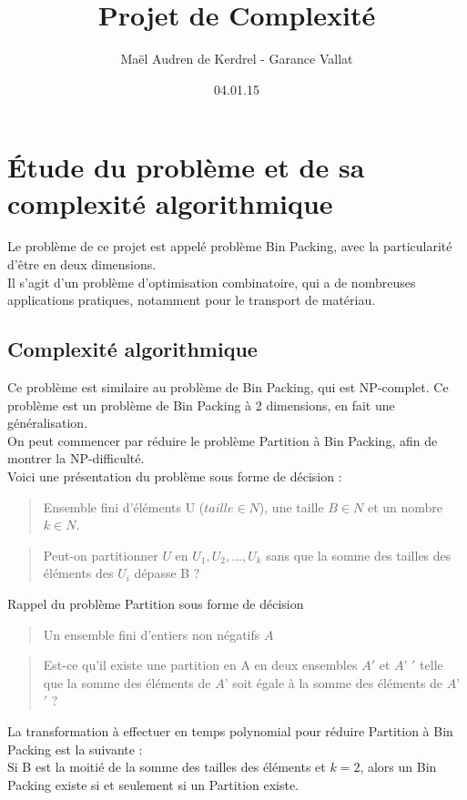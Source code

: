 \documentclass[12pt]{article}
\title{Projet de Complexité}
\author{Maël Audren de Kerdrel - Garance Vallat}
\date{04.01.15}
\begin{document}
\maketitle
\newpage


\section{Étude du problème et de sa complexité algorithmique}
Le problème de ce projet est appelé problème Bin Packing, avec la particularité d'être en deux dimensions. \\
Il s'agit d'un problème d'optimisation combinatoire, qui a de nombreuses applications pratiques, notamment pour le transport de matériau.


\subsection*{Complexité algorithmique}
Ce problème est similaire au problème de Bin Packing, qui est NP-complet. 
Ce problème est un problème de Bin Packing à 2 dimensions, en fait une généralisation. \\
On peut commencer par réduire le problème Partition à Bin Packing, afin de montrer la NP-difficulté. \\

Voici une présentation du problème sous forme de décision : \\
   \begin{quote}
Ensemble fini d'éléments U ($taille \in N$), une taille $B\in N$ et un nombre $k\in N$.  \end{quote}
   \begin{quote}
Peut-on partitionner $U$ en $U_1, U_2, ..., U_k$ sans que la somme des tailles des éléments des $U_i$ dépasse B ?  \end{quote}

Rappel du problème Partition sous forme de décision\\
  \begin{quote}
 Un ensemble fini d’entiers non négatifs $A$  \end{quote}
 \begin{quote}
 Est-ce qu’il existe une partition en A en deux ensembles $A'$ et $A’$ $'$ telle que la somme des éléments de $A’$ soit égale à la somme des éléments de $A’$ $'$ ?
 \end{quote}
La transformation à effectuer en temps polynomial pour réduire Partition à Bin Packing est la suivante : \\
Si B est la moitié de la somme des tailles des éléments et $ k = 2$, alors un Bin Packing existe si et seulement si un Partition existe. \\
\end{document}
